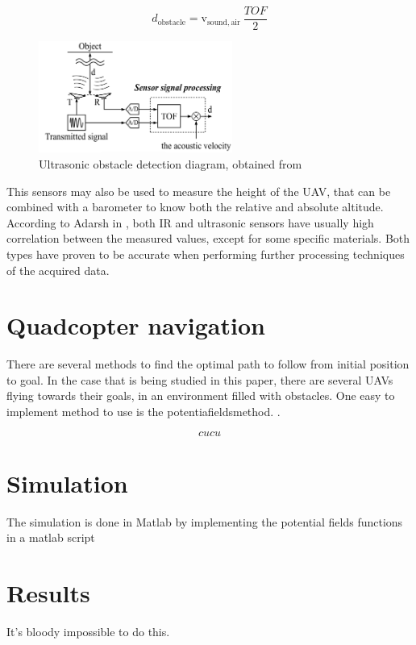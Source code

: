 \documentclass[journal]{IEEEtran}
\newcommand*{\subb}[1]{_{\mathrm{#1}}}
\begin{document}
		\begin{equation} \label{eq:ultrasonic_formula}
		d\subb{obstacle} = \textrm{v}\subb{sound, air} \ \frac{TOF}{2}
		\end{equation}
		\begin{figure}
			\centering
			\includegraphics[width=2.5in]{ultrasonic2}
			\caption{Ultrasonic obstacle detection diagram, obtained from \cite{hirata2008cross}}
			\label{fig:ultrasonic}
		\end{figure}
		
		This sensors may also be used to measure the height of the UAV, that can be combined with a barometer to know both the relative and absolute altitude. According to Adarsh in \cite{AdarshS2016PcoI}, both IR and ultrasonic sensors have usually high correlation between the measured values, except for some specific materials. Both types have proven to be accurate when performing further processing techniques of the acquired data.
		
	\section{Quadcopter navigation}
	There are several methods to find the optimal path to follow from initial position to goal. In the case that is being studied in this paper, there are several UAVs flying towards their goals, in an environment filled with obstacles. One easy to implement method to use is the potentiafieldsmethod.  \cite{potfieldsmethod}.
	
	\begin{equation} \label{eq:pot_}
	cucu
	\end{equation}
	
	\section{Simulation}
	The simulation is done in Matlab by implementing the potential fields functions in a matlab script 	
	
	\section{Results}
	It's bloody impossible to do this.
	
\end{document}
